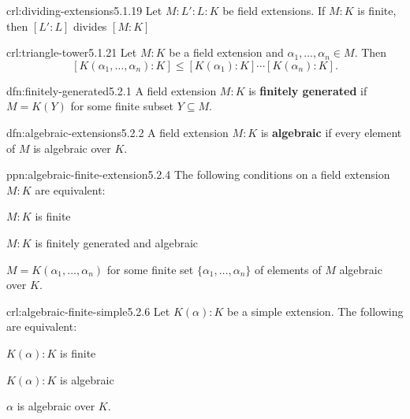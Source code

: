 \documentclass[landscape, 8pt]{extarticle}
\begin{document}
\begin{multicols}{3}

\begin{crl}{crl:dividing-extensions}{5.1.19}
    Let $M : L' : L : K$ be field extensions. If $M : K$ is finite, then $[L' : L]$ divides $[M : K]$
\end{crl}

\begin{crl}{crl:triangle-tower}{5.1.21}
    Let $M : K$ be a field extension and $\alpha_{1},\dots,\alpha_{n}\in M$. Then
    \[[K(\alpha_{1},\dots,\alpha_{n}) : K] \le [K(\alpha_{1}) : K] \cdots [K(\alpha_{n}) : K].\]
\end{crl}


\begin{dfn}{dfn:finitely-generated}{5.2.1}
    A field extension $M : K$ is \textbf{finitely generated} if $M = K(Y)$ for some finite subset $Y \subseteq M$.
\end{dfn}

\begin{dfn}{dfn:algebraic-extensions}{5.2.2}
    A field extension $M : K$ is \textbf{algebraic} if every element of $M$ is algebraic over $K$.
\end{dfn}

\begin{ppn}{ppn:algebraic-finite-extension}{5.2.4}
    The following conditions on a field extension $M : K$ are equivalent:
    \begin{enumerate-tight}
        \item $M : K$ is finite
        \item $M : K$ is finitely generated and algebraic
        \item $M = K(\alpha_{1},\dots,\alpha_{n})$ for some finite set $\{\alpha_{1},\dots,\alpha_{n}\}$ of elements of $M$ algebraic over $K$.
    \end{enumerate-tight}
\end{ppn}

\begin{crl}{crl:algebraic-finite-simple}{5.2.6}
    Let $K(\alpha) : K$ be a simple extension. The following are equivalent:
    \begin{enumerate-tight}
        \item $K(\alpha) : K$ is finite
        \item $K(\alpha) : K$ is algebraic
        \item $\alpha$ is algebraic over $K$.
    \end{enumerate-tight}


\end{crl}
\end{multicols}
\end{document}
